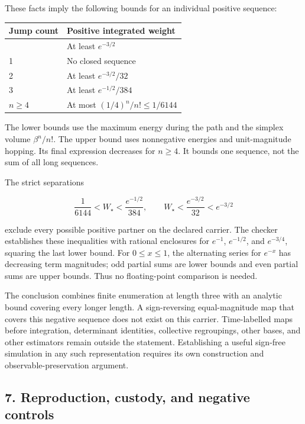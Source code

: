 \documentclass[
  11pt,
]{article}
\begin{document}
These facts imply the following bounds for an individual positive
sequence:

\begin{longtable}[]{@{}ll@{}}
\toprule\noalign{}
Jump count & Positive integrated weight \\
\midrule\noalign{}
\endhead
\bottomrule\noalign{}
\endlastfoot
0 & At least \(e^{-3/2}\) \\
1 & No closed sequence \\
2 & At least \(e^{-3/2}/32\) \\
3 & At least \(e^{-1/2}/384\) \\
\(n\geq4\) & At most \((1/4)^n/n!\leq1/6144\) \\
\end{longtable}

The lower bounds use the maximum energy during the path and the simplex
volume \(\beta^n/n!\). The upper bound uses nonnegative energies and
unit-magnitude hopping. Its final expression decreases for \(n\geq4\).
It bounds one sequence, not the sum of all long sequences.

The strict separations

\[
\frac1{6144}<W_\star<
\frac{e^{-1/2}}{384},\qquad
W_\star<\frac{e^{-3/2}}{32}<e^{-3/2}
\]

exclude every possible positive partner on the declared carrier. The
checker establishes these inequalities with rational enclosures for
\(e^{-1}\), \(e^{-1/2}\), and \(e^{-3/4}\), squaring the last lower
bound. For \(0\leq x\leq1\), the alternating series for \(e^{-x}\) has
decreasing term magnitudes; odd partial sums are lower bounds and even
partial sums are upper bounds. Thus no floating-point comparison is
needed.

The conclusion combines finite enumeration at length three with an
analytic bound covering every longer length. A sign-reversing
equal-magnitude map that covers this negative sequence does not exist on
this carrier. Time-labelled maps before integration, determinant
identities, collective regroupings, other bases, and other estimators
remain outside the statement. Establishing a useful sign-free simulation
in any such representation requires its own construction and
observable-preservation argument.

\hypertarget{reproduction-custody-and-negative-controls}{%
\subsection{7. Reproduction, custody, and negative
controls}\label{reproduction-custody-and-negative-controls}}
\end{document}
